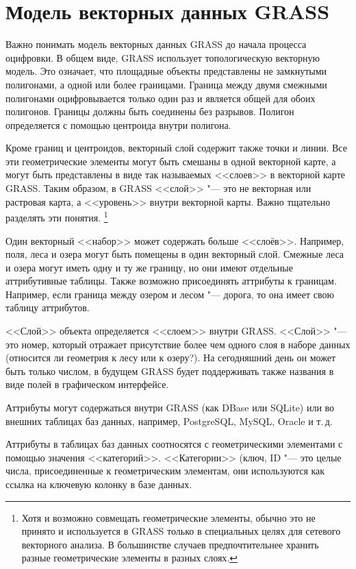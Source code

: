 \section{Модель векторных данных GRASS}\label{label_vectmodel}

Важно понимать модель векторных данных GRASS до начала процесса оцифровки.
В общем виде, GRASS использует топологическую векторную модель.
Это означает, что площадные объекты представлены не замкнутыми
полигонами, а одной или более границами. Граница между двумя смежными
полигонами оцифровывается только один раз и является общей для обоих
полигонов. Границы должны быть соединены без разрывов. Полигон
определяется с помощью центроида внутри полигона.

Кроме границ и центроидов, векторный слой содержит также точки и линии.
Все эти геометрические элементы могут быть смешаны в одной векторной
карте, а могут быть представлены в виде так называемых <<слоев>> в
векторной карте GRASS. Таким образом, в GRASS <<слой>> "--- это не
векторная или растровая карта, а <<уровень>> внутри векторной карты.
Важно тщательно разделять эти понятия.
\footnote{Хотя и возможно совмещать геометрические элементы, обычно это
не принято и используется в GRASS только в специальных целях для сетевого
векторного анализа. В большинстве случаев предпочтительнее хранить разные
геометрические элементы в разных слоях.}

Один векторный <<набор>> может содержать больше <<слоёв>>. Например,
поля, леса и озера могут быть помещены в один векторный слой. Смежные
леса и озера могут иметь одну и ту же границу, но они имеют отдельные
аттрибутивные таблицы. Также возможно присоединять аттрибуты к границам.
Например, если граница между озером и лесом "--- дорога, то она имеет
свою таблицу аттрибутов.

<<Слой>> объекта определяется <<слоем>> внутри GRASS. <<Слой>> "--- это
номер, который отражает присутствие более чем одного слоя в наборе
данных (относится ли геометрия к лесу или к озеру?). На сегодняшний день
он может быть только числом, в будущем GRASS будет поддерживать также
названия в виде полей в графическом интерфейсе.

Аттрибуты могут содержаться внутри  GRASS (как DBase
или SQLite) или во внешних таблицах баз данных, например, PostgreSQL,
MySQL, Oracle и т.\,д.

Аттрибуты в таблицах баз данных соотносятся с геометрическими
элементами с помощью значения <<категорий>>.
<<Категории>> (ключ, ID "--- это целые числа, присоединенные к
геометрическим элементам, они используются как ссылка на ключевую
колонку в базе данных.

